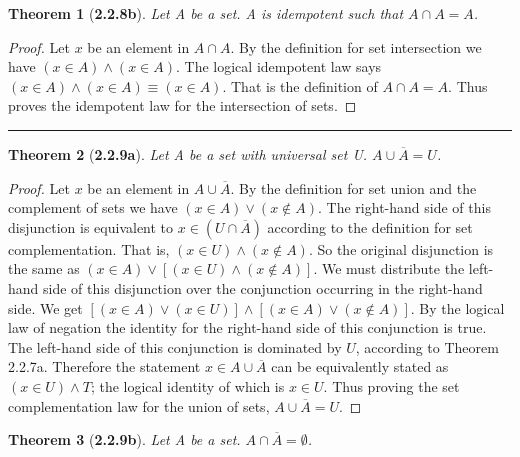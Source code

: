 \documentclass[a4paper, 12pt]{article}
\theoremstyle{plain}
\newtheorem*{theorem*}{Theorem}
\begin{document}
\begin{theorem*}[\textbf{2.2.8b}]
    Let A be a set. A is idempotent such that $A \cap A = A$.
\end{theorem*}

\begin{proof}
    Let $x$ be an element in $A \cap A$. By the definition for set intersection we have 
    $(x \in A) \land (x \in A)$. The logical idempotent law says \newline 
    $(x \in A) \land (x \in A) \equiv (x \in A)$. That is the definition of $A \cap A = A$. 
    Thus proves the idempotent law for the intersection of sets.
\end{proof}
\begin{center}
    \rule{5.4in}{1pt}
\end{center}


\begin{theorem*}[\textbf{2.2.9a}]
    Let A be a set with universal set U. $A \cup \overline{A} = U$.
\end{theorem*}

\begin{proof}
    Let $x$ be an element in $A \cup \overline{A}$. By the definition for set union and the complement 
    of sets we have $(x \in A) \lor (x \notin A)$. The right-hand side of this disjunction is 
    equivalent to $x \in (U \cap \overline{A})$ according to the definition for set complementation. 
    That is, $(x \in U) \land (x \notin A)$. So the original disjunction is the same as 
    $(x \in A) \lor [(x \in U) \land (x \notin A)]$. We must distribute the left-hand side of this 
    disjunction over the conjunction occurring in the right-hand side. We get 
    $[(x \in A) \lor (x \in U)] \land [(x \in A) \lor (x \notin A)]$. By the logical law of negation 
    the identity for the right-hand side of this conjunction is true. The left-hand side of this 
    conjunction is dominated by $U$, according to Theorem 2.2.7a. Therefore the statement 
    $x \in A \cup \overline{A}$ can be equivalently stated as $(x \in U) \land T$; the logical identity 
    of which is $x \in U$. Thus proving the set complementation law for the union of sets, 
    $A \cup \overline{A} = U$.
\end{proof}

\pagebreak


\begin{theorem*}[\textbf{2.2.9b}]
    Let A be a set. $A \cap \overline{A} = \emptyset$.
\end{theorem*}
\end{document}
